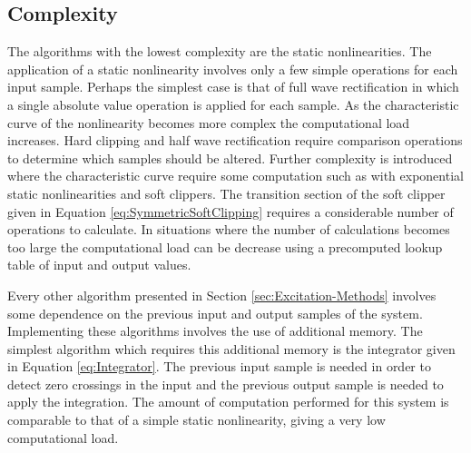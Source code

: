 	\subsection{Complexity}
	\label{sec:ExcitationEvaluation-Comparison-Complexity}
		The algorithms with the lowest complexity are the static nonlinearities. The application of a static
		nonlinearity involves only a few simple operations for each input sample. Perhaps the simplest case is that
		of full wave rectification in which a single absolute value operation is applied for each sample. As the
		characteristic curve of the nonlinearity becomes more complex the computational load increases. Hard
		clipping and half wave rectification require comparison operations to determine which samples should be
		altered. Further complexity is introduced where the characteristic curve require some computation such as
		with exponential static nonlinearities and soft clippers. The transition section of the soft clipper given
		in Equation \ref{eq:SymmetricSoftClipping} requires a considerable number of operations to calculate. In
		situations where the number of calculations becomes too large the computational load can be decrease using a
		precomputed lookup table of input and output values.

		Every other algorithm presented in Section \ref{sec:Excitation-Methods} involves some dependence on the
		previous input and output samples of the system. Implementing these algorithms involves the use of
		additional memory. The simplest algorithm which requires this additional memory is the integrator given in
		Equation \ref{eq:Integrator}. The previous input sample is needed in order to detect zero crossings in the
		input and the previous output sample is needed to apply the integration. The amount of computation performed
		for this system is comparable to that of a simple static nonlinearity, giving a very low computational load.

